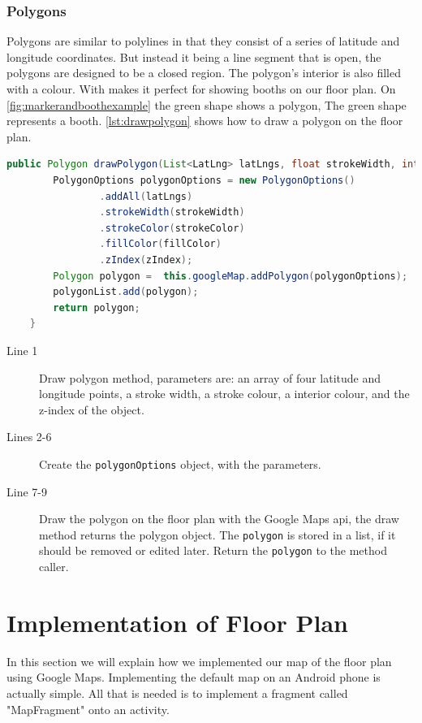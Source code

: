 \subsubsection*{Polygons}
Polygons are similar to polylines in that they consist of a series of latitude and longitude coordinates. But instead it being a line segment that is open, the polygons are designed to be a closed region. The polygon's interior is also filled with a colour. With makes it perfect for showing booths on our floor plan.
On \autoref{fig:markerandboothexample} the green shape shows a polygon, The green shape represents a booth. \autoref{lst:drawpolygon} shows how to draw a polygon on the floor plan.
\begin{lstlisting}[language=java, label=lst:drawpolygon, caption=Method for drawing a polygon.]
    public Polygon drawPolygon(List<LatLng> latLngs, float strokeWidth, int strokeColor, int fillColor, int zIndex){
        PolygonOptions polygonOptions = new PolygonOptions()
                .addAll(latLngs)
                .strokeWidth(strokeWidth)
                .strokeColor(strokeColor)
                .fillColor(fillColor)
                .zIndex(zIndex);
        Polygon polygon =  this.googleMap.addPolygon(polygonOptions);
        polygonList.add(polygon);
        return polygon;
    }
\end{lstlisting}
\begin{description}
\item[Line 1] Draw polygon method, parameters are: an array of four latitude and longitude points, a stroke width, a stroke colour, a interior colour, and the z-index of the object. 
\item[Lines 2-6] Create the \lstinline|polygonOptions| object, with the parameters.
\item[Line 7-9] Draw the polygon on the floor plan with the Google Maps \ac{api}, the draw method returns the polygon object. The \lstinline|polygon| is stored in a list, if it should be removed or edited later. Return the \lstinline|polygon| to the method caller.
\end{description}

\section{Implementation of Floor Plan}
In this section we will explain how we implemented our map of the floor plan using Google Maps. Implementing the default map on an Android phone is actually simple. All that is needed is to implement a fragment called "MapFragment" onto an activity.

